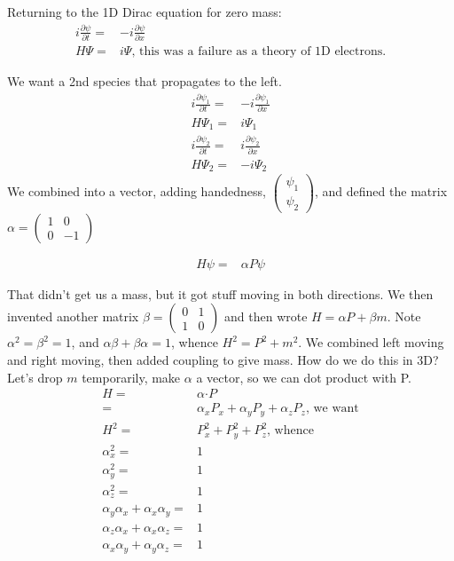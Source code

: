 \documentclass[]{article}
\begin{document}
Returning to the 1D Dirac equation for zero mass:
\begin{align*}
i \frac{\partial \psi}{\partial t}=& -i \frac{\partial \psi}{\partial x} \\
H \Psi =& i \Psi \text{, this was a failure as a theory of 1D electrons.}
\end{align*}

We want a 2nd species that propagates to the left.
\begin{align*}
i \frac{\partial \psi_1}{\partial t}=& -i \frac{\partial \psi_1}{\partial x} \\
H \Psi_1 =& i \Psi_1\\
i \frac{\partial \psi_2}{\partial t}=& i \frac{\partial \psi_2}{\partial x} \\
H \Psi_2 =& -i \Psi_2
\end{align*}
We combined into a vector, adding handedness, $\begin{pmatrix} \psi_1\\ \psi_2 \end{pmatrix}$, and defined the matrix $\alpha = \begin{pmatrix}
1&0\\
0&-1
\end{pmatrix}$

\begin{align*}
H \psi =& \alpha P \psi
\end{align*}

That didn't get us a mass, but it got stuff moving in both directions. We then invented another matrix $\beta=\begin{pmatrix}
0&1\\
1&0
\end{pmatrix}$ and then wrote $H = \alpha P + \beta m$. Note $\alpha^2=\beta^2=1$, and $\alpha\beta + \beta\alpha=1$, whence $H^2=P^2+m^2$. We combined left moving and right moving, then added coupling to give mass. How do we do this in 3D?
 Let's  drop $m$ temporarily, make $\alpha$ a vector, so we can dot product with P.
\begin{align*}
H =& \alpha \boldsymbol{\cdot} P\\
=& \alpha_x P_x + \alpha_y P_y + \alpha_z P_z \text{, we want}\\
H^2 =& P_x^2 + P_y^2 + P_z^2 \text{, whence}\\
\alpha_x^2 =&1\\
\alpha_y^2 = &1\\
\alpha_z^2 =& 1 \\
\alpha_y\alpha_x + \alpha_x\alpha_y=&1\\
\alpha_z\alpha_x + \alpha_x\alpha_z=&1\\
\alpha_x\alpha_y + \alpha_y\alpha_z=&1
\end{align*}
\end{document}
